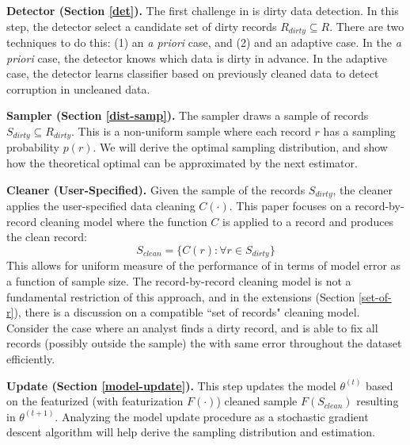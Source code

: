 \vspace{0.5em}

\noindent\textbf{Detector (Section \ref{det}). } The first challenge in \sys is dirty data detection. In this step, the detector select a candidate set of dirty records $R_{dirty} \subseteq R$. There are two techniques to do this: (1) an \emph{a priori} case, and (2) and an adaptive case. In the \emph{a priori} case, the detector knows which data is dirty in advance. In the adaptive case, the detector learns classifier based on previously cleaned data to detect corruption in uncleaned data.

\vspace{0.5em}

\noindent\textbf{Sampler (Section \ref{dist-samp}). } The sampler draws a sample of records $S_{dirty} \subseteq R_{dirty}$. This is a non-uniform sample where each record $r$ has a sampling probability $p(r)$.
We will derive the optimal sampling distribution, and show how the theoretical optimal can be approximated by the next estimator.

\vspace{0.5em}

\noindent\textbf{Cleaner (User-Specified). } Given the sample of the records $S_{dirty}$,  the cleaner applies the user-specified data cleaning $C(\cdot)$. This paper focuses on a record-by-record cleaning model where the function $C$ is applied to a record and produces the clean record:
\[
S_{clean} = \{C(r) : \forall r \in S_{dirty}\}
\]
This allows for uniform measure of the performance of \sys in terms of model error as a function of sample size. The record-by-record cleaning model is not a fundamental restriction of this approach, and in the extensions (Section \ref{set-of-r}), there is a discussion on a compatible ``set of records" cleaning model. Consider the case where an analyst finds a dirty record, and is able to fix all records (possibly outside the sample) the with same error throughout the dataset efficiently.

\vspace{0.5em}

\noindent\textbf{Update (Section \ref{model-update}). } This step updates the model $\theta^{(t)}$ based on the featurized (with featurization $F(\cdot)$) cleaned sample $F(S_{clean})$ resulting in $\theta^{(t+1)}$. Analyzing the model update procedure as a stochastic gradient descent algorithm will help derive the sampling distribution and estimation.

\vspace{0.5em}

